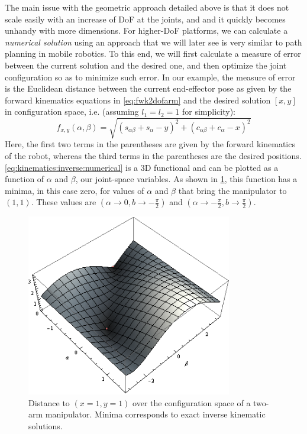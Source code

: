 The main issue with the geometric approach detailed above is that it does not scale easily with an increase of DoF at the joints, and and it quickly becomes unhandy with more dimensions.
For higher-DoF platforms, we can calculate a \textsl{numerical solution} using an approach that we will later see is very similar to path planning in mobile robotics.
To this end, we will first calculate a measure of error between the current solution and the desired one, and then optimize the joint configuration so as to minimize such error.
In our example, the measure of error is the Euclidean distance between the current end-effector pose as given by the forward kinematics equations in \cref{eq:fwk2dofarm} and the desired solution $[x,y]$ in configuration space, i.e. (assuming $l_1=l_2=1$ for simplicity):
\begin{equation}\label{eq:kinematics:inverse:numerical}
f_{x,y}(\alpha,\beta)=\sqrt{\left(s_{\alpha\beta} + s_\alpha - y\right)^2 + \left(c_{\alpha\beta}+c_\alpha - x\right)^2}
\end{equation}
Here, the first two terms in the parentheses are given by the forward kinematics of the robot, whereas the third terms in the parentheses are the desired positions.
\cref{eq:kinematics:inverse:numerical} is a 3D functional and can be plotted as a function of $\alpha$ and $\beta$, our joint-space variables.
As shown in \cref{fig:inversekinematics}, this function has a minima, in this case zero, for values of $\alpha$ and $\beta$ that bring the manipulator to $(1,1)$. These values are $(\alpha \rightarrow 0, b \rightarrow -\frac{\pi}{2})$ and $(\alpha \rightarrow -\frac{\pi}{2}, b \rightarrow \frac{\pi}{2})$.

\begin{figure}
    \centering
        \includegraphics[width=0.8\textwidth]{figs/kinematics/inversekinematics}
    \caption{Distance to $(x=1,y=1)$ over the configuration space of a two-arm manipulator. Minima corresponds to exact inverse kinematic solutions.}
    \label{fig:inversekinematics}
\end{figure}

